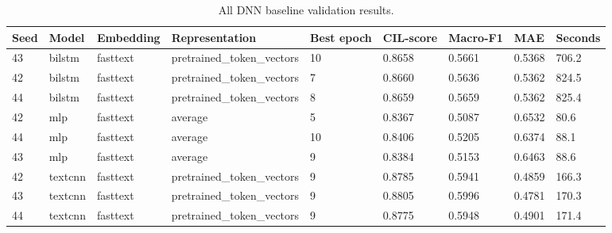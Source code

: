 \begin{table}[htbp]
\centering
\caption{All DNN baseline validation results.}
\label{tab:dnn-full-results}
\begin{tabular}{lllllllll}
\toprule
Seed & Model & Embedding & Representation & Best epoch & CIL-score & Macro-F1 & MAE & Seconds \\
\midrule
43 & bilstm & fasttext & pretrained\_token\_vectors & 10 & 0.8658 & 0.5661 & 0.5368 & 706.2 \\
42 & bilstm & fasttext & pretrained\_token\_vectors & 7 & 0.8660 & 0.5636 & 0.5362 & 824.5 \\
44 & bilstm & fasttext & pretrained\_token\_vectors & 8 & 0.8659 & 0.5659 & 0.5362 & 825.4 \\
42 & mlp & fasttext & average & 5 & 0.8367 & 0.5087 & 0.6532 & 80.6 \\
44 & mlp & fasttext & average & 10 & 0.8406 & 0.5205 & 0.6374 & 88.1 \\
43 & mlp & fasttext & average & 9 & 0.8384 & 0.5153 & 0.6463 & 88.6 \\
42 & textcnn & fasttext & pretrained\_token\_vectors & 9 & 0.8785 & 0.5941 & 0.4859 & 166.3 \\
43 & textcnn & fasttext & pretrained\_token\_vectors & 9 & 0.8805 & 0.5996 & 0.4781 & 170.3 \\
44 & textcnn & fasttext & pretrained\_token\_vectors & 9 & 0.8775 & 0.5948 & 0.4901 & 171.4 \\
\bottomrule
\end{tabular}
\end{table}
